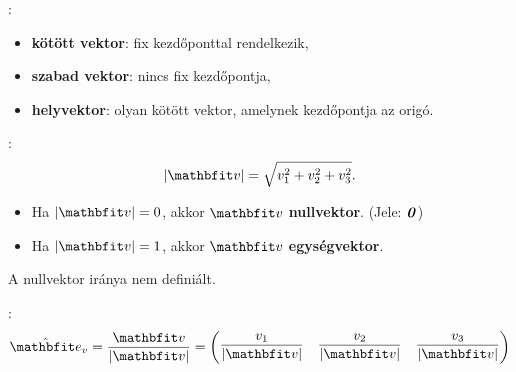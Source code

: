 \documentclass[a4paper, 12pt]{scrartcl}
\begin{document}
\begin{blueBox}
  :

  \begin{itemize}
    \item \textbf{kötött vektor}: fix kezdőponttal rendelkezik,
    \item \textbf{szabad vektor}: nincs fix kezdőpontja,
    \item \textbf{helyvektor}: olyan kötött vektor, amelynek kezdőpontja az
          origó.
  \end{itemize}
\end{blueBox}

\begin{blueBox}
  :
  \[
    |\rvec v| = \sqrt{v_1^2 + v_2^2 + v_3^2}
    \text.
  \]

  \begin{itemize}
    \item Ha $|\rvec v| = 0$, akkor $\rvec v$ \textbf{nullvektor}.
          (Jele: $\text{\textbf{\textit{0}}}$)
    \item Ha $|\rvec v| = 1$, akkor $\rvec v$ \textbf{egységvektor}.
  \end{itemize}
\end{blueBox}

\begin{note}
  A nullvektor iránya nem definiált.
\end{note}

\begin{blueBox}
  :
  \[
    \uvec e_v
    = \frac{\rvec v}{|\rvec v|}
    = \begin{pmatrix}
      \dfrac{v_1}{|\rvec v|} &
      \dfrac{v_2}{|\rvec v|} &
      \dfrac{v_3}{|\rvec v|}
    \end{pmatrix}
  \]
\end{blueBox}
\end{document}
